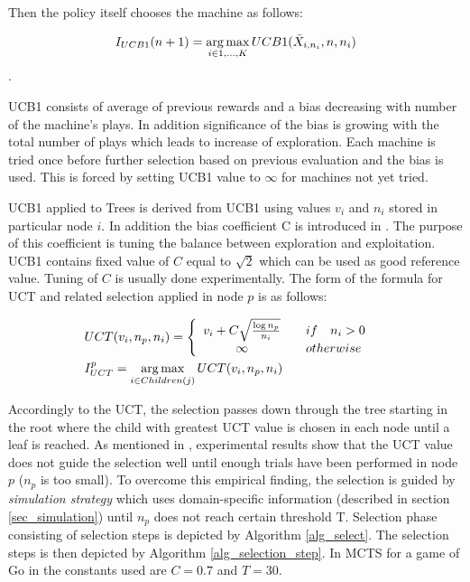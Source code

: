Then the policy itself chooses the machine as follows:

\begin{equation}
 I_{UCB1}(n+1) = \operatorname*{arg\,max}\limits_{i\in{1,\ldots,K}} UCB1(\bar{X}_{i,n_i},n,n_i)
 \end{equation}.

UCB1 consists of average of previous rewards and a bias decreasing with number of the
machine's plays. In addition significance of the bias is growing with the total number of plays
which 
leads to increase of exploration. Each machine is tried once before further selection based on
previous evaluation and the bias is used. This is forced by setting UCB1 value to $\infty$ for
machines not yet tried.

UCB1 applied to Trees \cite{Kocsis2006} is derived from UCB1 using values $v_i$ and $n_i$ stored in
particular node $i$. In addition the bias coefficient C is introduced in \cite{Chaslot2008}.
The purpose of this coefficient is tuning the balance between exploration and exploitation.
UCB1 contains fixed value of $C$ equal to $\sqrt{2}$ which can be used as good reference value.
Tuning of $C$ is usually done 
experimentally. The form of the formula for UCT and related selection applied in node $p$ is as
follows:

\begin{align}
    &\begin{aligned}
UCT(v_i,n_p,n_i) &= \left\{
        \begin{array}{c@{\quad\quad}l}
            v_i + C \sqrt{{\log{n_p}} \over n_i} & if \quad n_i > 0 \\
            \infty & otherwise \\
        \end{array}
    \right.
    \end{aligned}\\
    &\begin{aligned}
I_{UCT}^p &= \argmax\limits_{i \in Children(j)} UCT(v_i, n_p, n_i)
    \end{aligned}
\end{align}



Accordingly to the UCT, the selection passes down through the tree starting in the
root where the child with greatest UCT value is chosen in each node until a leaf is reached.
As mentioned in \cite{Chaslot2008}, experimental results show that the UCT value does not 
guide the selection well until
enough trials have been performed in node $p$ ($n_p$ is too small). To overcome this empirical
finding, the selection is guided by \emph{simulation strategy} which uses domain-specific
information (described in section
\ref{sec_simulation}) until $n_p$ does not reach certain threshold T. Selection phase
consisting of selection steps is
depicted by Algorithm \ref{alg_select}. The selection steps is then depicted by Algorithm
\ref{alg_selection_step}. In MCTS for a game of Go in \cite{Chaslot2008} the constants used
are $C= 0.7$ and $T=30$.




